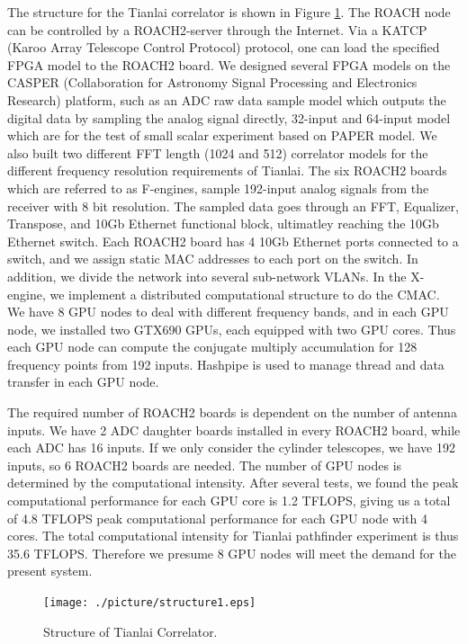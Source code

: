 \documentclass{ws-jai}
\begin{document}
	The structure for the Tianlai correlator is shown in Figure \ref{fig:structure}. The ROACH node can be controlled by a ROACH2-server through the Internet. Via a KATCP (Karoo Array Telescope Control Protocol) protocol, one can load the specified FPGA model to the ROACH2 board. We designed several FPGA models on the CASPER (Collaboration for Astronomy Signal Processing and Electronics Research) platform, such as an ADC raw data sample model which outputs the digital data by sampling the analog signal directly, 32-input and 64-input model which are for the test of small scalar experiment based on PAPER model.  We also built two different FFT length (1024 and 512) correlator models for the different frequency resolution requirements of Tianlai. The six ROACH2 boards which are referred to as F-engines, sample 192-input analog signals from the receiver with 8 bit resolution. The sampled data goes through an FFT, Equalizer, Transpose, and 10Gb Ethernet functional block, ultimatley reaching the 10Gb Ethernet switch. Each ROACH2 board has 4 10Gb Ethernet ports connected to a switch, and we assign static MAC addresses to each port on the switch. In addition, we divide the network into several sub-network VLANs. In the X-engine, we implement a distributed computational structure to do the CMAC. We have 8 GPU nodes to deal with different frequency bands, and in each GPU node, we installed two GTX690 GPUs, each equipped with two GPU cores. Thus each GPU node can compute the conjugate multiply accumulation for 128 frequency points from 192 inputs. Hashpipe is used to manage thread and data transfer in each GPU node. 
		
	The required number of ROACH2 boards is dependent on the number of antenna inputs. We have 2 ADC daughter boards installed in every ROACH2 board, while each ADC has 16 inputs. If we only consider the cylinder telescopes, we have 192 inputs, so 6 ROACH2 boards are needed. The number of GPU nodes is determined by the computational intensity. After several tests, we found the peak computational performance for each GPU core is 1.2 TFLOPS, giving us a total of 4.8 TFLOPS peak computational performance for each GPU node with 4 cores. The total computational intensity for Tianlai pathfinder experiment is thus 35.6 TFLOPS. Therefore we presume 8 GPU nodes will meet the demand for the present system.
\begin{figure}[t]
 \centering
 \texttt{[image: ./picture/structure1.eps]}
\caption{Structure of Tianlai Correlator.\label{fig:structure}}
\end{figure}
\\
\end{document}
